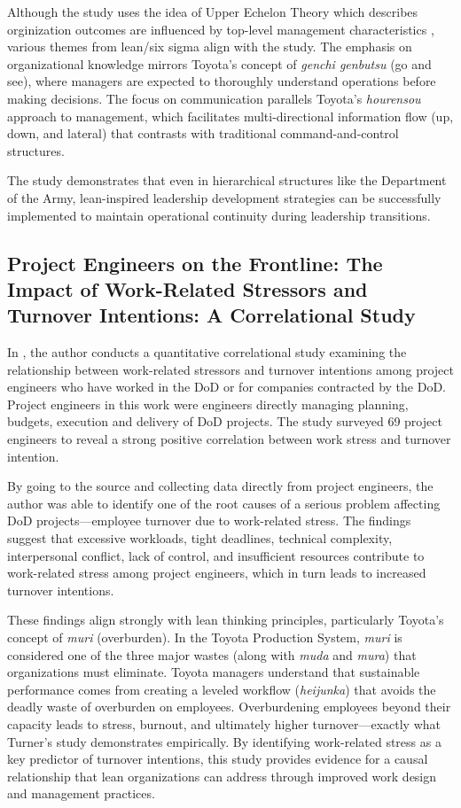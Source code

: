 \documentclass{article}
\begin{document}
		Although the study uses the idea of Upper Echelon Theory which describes orginization outcomes are influenced by top-level management characteristics \cite{uppere}, various themes from lean/six sigma align with the study.
		The emphasis on organizational knowledge mirrors Toyota's concept of \textit{genchi genbutsu} (go and see), where managers are expected to thoroughly understand operations before making decisions. 
		The focus on communication parallels Toyota's \textit{hourensou} approach to management, which facilitates multi-directional information flow (up, down, and lateral) that contrasts with traditional command-and-control structures.

		The study demonstrates that even in hierarchical structures like the Department of the Army, lean-inspired leadership development strategies can be successfully implemented to maintain operational continuity during leadership transitions.


	\subsection{Project Engineers on the Frontline: The Impact of Work-Related Stressors and Turnover Intentions: A Correlational Study \cite{Turner2024}}

		In \cite{Turner2024}, the author conducts a quantitative correlational study examining the relationship between work-related stressors and turnover intentions among project engineers who have worked in the DoD or for companies contracted by the DoD. 
		Project engineers in this work were engineers directly managing planning, budgets, execution and delivery of DoD projects.
		The study surveyed 69 project engineers to reveal a strong positive correlation between work stress and turnover intention.

		By going to the source and collecting data directly from project engineers, the author was able to identify one of the root causes of a serious problem affecting DoD projects—employee turnover due to work-related stress. 
		The findings suggest that excessive workloads, tight deadlines, technical complexity, interpersonal conflict, lack of control, and insufficient resources contribute to work-related stress among project engineers, which in turn leads to increased turnover intentions.

		These findings align strongly with lean thinking principles, particularly Toyota's concept of \textit{muri} (overburden). 
		In the Toyota Production System, \textit{muri} is considered one of the three major wastes (along with \textit{muda} and \textit{mura}) that organizations must eliminate.
		Toyota managers understand that sustainable performance comes from creating a leveled workflow (\textit{heijunka}) that avoids the deadly waste of overburden on employees. 
		Overburdening employees beyond their capacity leads to stress, burnout, and ultimately higher turnover—exactly what Turner's study demonstrates empirically. 
		By identifying work-related stress as a key predictor of turnover intentions, this study provides evidence for a causal relationship that lean organizations can address through improved work design and management practices.
\end{document}

